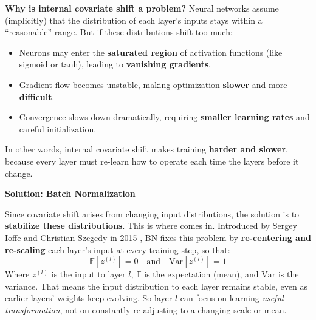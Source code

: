 \highspace
\textcolor{Red2}{ \textbf{Why is internal covariate shift a problem?}} Neural networks assume (implicitly) that the distribution of each layer's inputs stays within a ``reasonable'' range. But if these distributions shift too much:
\begin{itemize}
    \item Neurons may enter the \textbf{saturated region} of activation functions (like sigmoid or tanh), leading to \textbf{vanishing gradients}.
    \item Gradient flow becomes unstable, making optimization \textbf{slower} and more \textbf{difficult}.
    \item Convergence slows down dramatically, requiring \textbf{smaller learning rates} and careful initialization.
\end{itemize}
In other words, internal covariate shift makes training \textbf{harder and slower}, because every layer must re-learn how to operate each time the layers before it change.

\newpage

\begin{flushleft}
    \textcolor{Green3}{ \textbf{Solution: Batch Normalization}}
\end{flushleft}
Since covariate shift arises from changing input distributions, the solution is to \textbf{stabilize these distributions}. This is where  comes in. Introduced by Sergey Ioffe and Christian Szegedy in 2015 \cite{ioffe2015batch}, BN fixes this problem by \textbf{re-centering and re-scaling} each layer's input at every training step, so that:
\begin{equation}
    \mathbb{E}\left[z^{(l)}\right] = 0 \quad \text{and} \quad \mathrm{Var}\left[z^{(l)}\right] = 1
\end{equation}
Where $z^{(l)}$ is the input to layer $l$, $\mathbb{E}$ is the expectation (mean), and $\mathrm{Var}$ is the variance. That means the input distribution to each layer remains stable, even as earlier layers' weights keep evolving. So layer $l$ can focus on learning \emph{useful transformation}, not on constantly re-adjusting to a changing scale or mean.


